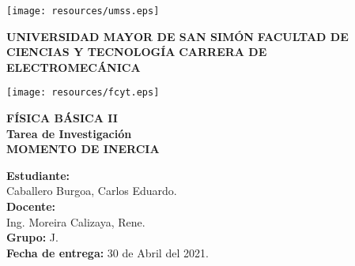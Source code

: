 \documentclass[letter,twoside,11pt]{article}
\begin{document}
\begin{titlepage}
    \begin{center}
        \begin{minipage}[]{.20\linewidth}
            \begin{flushleft}
                \texttt{[image: resources/umss.eps]}
            \end{flushleft}
        \end{minipage}
        \begin{minipage}[]{.55\linewidth}
            \centering
            \large{\textbf{UNIVERSIDAD MAYOR DE SAN SIMÓN}} \newline
            \large{\textbf{FACULTAD DE CIENCIAS Y TECNOLOGÍA}} \newline
            \large{\textbf{CARRERA DE ELECTROMECÁNICA}} \newline
        \end{minipage}
        \begin{minipage}[]{.20\linewidth}
            \begin{flushright}
                \texttt{[image: resources/fcyt.eps]}
            \end{flushright}
        \end{minipage}

        \vspace*{3.0cm}
        {\Large \textbf{FÍSICA BÁSICA II}}\\
        \vspace*{0.3cm}
        {\Large \textbf{Tarea de Investigación}}\\
        \vspace*{3.5cm}
        {\Large \textbf{MOMENTO DE INERCIA}}\\
    \end{center}

    \vspace*{6.5cm}
    \leftskip=7.95cm
    \noindent
    \textbf{Estudiante:}\\
    Caballero Burgoa, Carlos Eduardo.\\
    \newline
    \textbf{Docente:}\\
    Ing. Moreira Calizaya, Rene.\\
    \newline
    \textbf{Grupo:} J.\\
    \textbf{Fecha de entrega:} 30 de Abril del 2021.\\
\end{titlepage}
\end{document}
